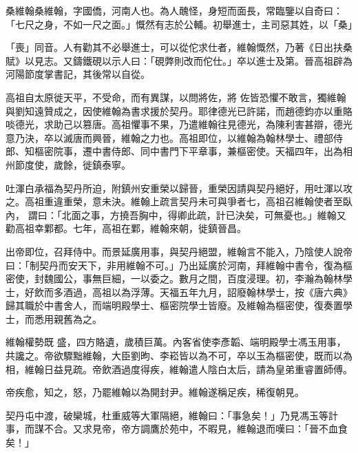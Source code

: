 
\begin{pinyinscope}

 桑維翰桑維翰，字國僑，河南人也。為人醜怪，身短而面長，常臨鑒以自奇曰：「七尺之身，不如一尺之面。」慨然有志於公輔。初舉進士，主司惡其姓，以「桑」



 「喪」同音。人有勸其不必舉進士，可以從佗求仕者，維翰慨然，乃著《日出扶桑賦》以見志。又鑄鐵硯以示人曰：「硯弊則改而佗仕。」卒以進士及第。晉高祖辟為河陽節度掌書記，其後常以自從。



 高祖自太原徙天平，不受命，而有異謀，以問將佐，將
 佐皆恐懼不敢言，獨維翰與劉知遠贊成之，因使維翰為書求援於契丹。耶律德光已許諾，而趙德鈞亦以重賂啖德光，求助己以篡唐。高祖懼事不果，乃遣維翰往見德光，為陳利害甚辯，德光意乃決，卒以滅唐而興晉，維翰之力也。高祖即位，以維翰為翰林學士、禮部侍郎、知樞密院事，遷中書侍郎、同中書門下平章事，兼樞密使。天福四年，出為相州節度使，歲餘，徙鎮泰寧。



 吐渾白承福為契丹所迫，附鎮州安重榮以歸晉，重榮因請與契丹絕好，用吐渾以攻之。高祖重違重榮，意未決。維翰上疏言契丹未可與爭者七，高祖召維翰使者至臥內，
 謂曰：「北面之事，方撓吾胸中，得卿此疏，計已決矣，可無憂也。」維翰又勸高祖幸鄴都。七年，高祖在鄴，維翰來朝，徙鎮晉昌。



 出帝即位，召拜侍中。而景延廣用事，與契丹絕盟，維翰言不能入，乃陰使人說帝曰：「制契丹而安天下，非用維翰不可。」乃出延廣於河南，拜維翰中書令，復為樞密使，封魏國公，事無巨細，一以委之。數月之間，百度浸理。初，李瀚為翰林學士，好飲而多酒過，高祖以為浮薄。天福五年九月，詔廢翰林學士，按《唐六典》歸其職於中書舍人，而端明殿學士、樞密院學士皆廢。及維翰為樞密使，復奏置學士，而悉用親舊為之。



 維翰權勢既
 盛，四方賂遺，歲積巨萬。內客省使李彥韜、端明殿學士馮玉用事，共讒之。帝欲驟黜維翰，大臣劉昫、李崧皆以為不可，卒以玉為樞密使，既而以為相，維翰日益見疏。帝飲酒過度得疾，維翰遣人陰白太后，請為皇弟重睿置師傅。



 帝疾愈，知之，怒，乃罷維翰以為開封尹。維翰遂稱足疾，稀復朝見。



 契丹屯中渡，破欒城，杜重威等大軍隔絕，維翰曰：「事急矣！」乃見馮玉等計事，而謀不合。又求見帝，帝方調鷹於苑中，不暇見，維翰退而嘆曰：「晉不血食矣！」




\end{pinyinscope}
